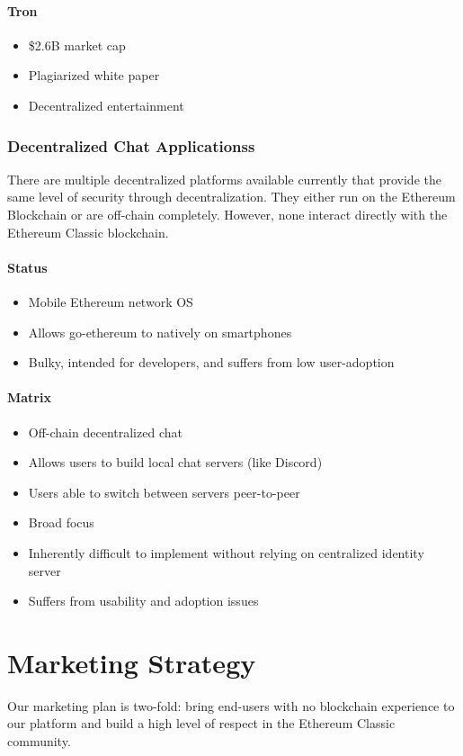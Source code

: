 \documentclass[11pt]{report}
\begin{document}
\subsubsection{Tron\cite{tron}}
\begin{itemize}
\item \$2.6B market cap
\item Plagiarized\cite{tron-plagiarized} white paper
\item Decentralized entertainment
\end{itemize}
\subsection{Decentralized Chat Applicationss}
There are multiple decentralized platforms available currently that provide the same level of security through decentralization. They either run on the Ethereum Blockchain or are off-chain completely. However, none interact directly with the Ethereum Classic blockchain.
\subsubsection{Status\cite{status}}
\begin{itemize}
\item Mobile Ethereum network OS
\item Allows go-ethereum to natively on smartphones
\item Bulky, intended for developers, and suffers from low user-adoption
\end{itemize}
\subsubsection{Matrix\cite{matrix}}
\begin{itemize}
\item Off-chain decentralized chat
\item Allows users to build local chat servers (like Discord)
\item Users able to switch between servers peer-to-peer
\item Broad focus
\item Inherently difficult to implement without relying on centralized identity server
\item Suffers from usability and adoption issues
\end{itemize}
\chapter{Marketing Strategy}
Our marketing plan is two-fold: bring end-users with no blockchain experience to our platform and build a high level of respect in the Ethereum Classic community.
\end{document}
